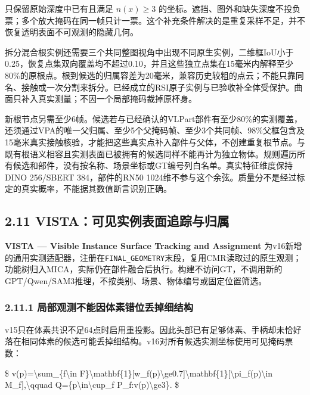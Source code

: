 \documentclass[UTF8,fontset=fandol]{ctexart}
\begin{document}
只保留原始深度中已有且满足 $n(x)\ge3$ 的坐标。遮挡、图外和缺失深度不投负票；多个放大掩码在同一帧只计一票。这个补充条件解决的是重复采样不足，并不恢复透明表面不可观测的隐藏几何。



拆分混合根实例还需要三个共同整图视角中出现不同原生实例，二维框IoU小于0.25，恢复点集双向覆盖均不超过0.10，并且这些独立点集在15毫米内解释至少80\%的原根点。根到候选的归属容差为20毫米，兼容历史较粗的点云；不能只靠同名、接触或一次分割来拆分。已经成立的RSI原子实例与已验收补全体受保护。曲面只补入真实测量；不因一个局部掩码裁掉原杯身。



新根节点另需至少6帧。候选若与已经确认的VLPart部件有至少80\%的实测覆盖，还须通过VPA的唯一父归属、至少5个父掩码帧、至少3个共同帧、98\%父框包含及15毫米真实接触核验，才能把这些真实点补入部件与父体，不创建重复根节点。与既有根语义相容且实测表面已被拥有的候选同样不能再计为独立物体。规则遍历所有候选和部件，没有按名称、场景坐标或GT编号列白名单。真实特征维度保持DINO 256/SBERT 384，部件的RN50 1024维不参与这个余弦。质量分不是经过标定的真实概率，不能据其数值断言识别正确。



\subsection*{2.11 VISTA：可见实例表面追踪与归属}

\textbf{VISTA — Visible Instance Surface Tracking and Assignment} 为v16新增的通用实测适配器，注册在\texttt{FINAL\_\allowbreak{}GEOMETRY}末段，复用CMR读取过的原生观测；功能树归入MICA，实际仍在部件融合后执行。构建不访问GT，不调用新的GPT/Qwen/SAM3推理，不按类别、场景、物体编号或固定位置筛选。



\subsubsection*{2.11.1 局部观测不能因体素错位丢掉细结构}

v15只在体素共识不足64点时启用重投影。因此头部已有足够体素、手柄却未恰好落在相同体素的候选可能丢掉细结构。v16对所有候选实测坐标使用可见掩码票数：



\$
v(p)=\textbackslash{}sum\_\{f\textbackslash{}in F\}\textbackslash{}mathbf\{1\}[w\_f(p)\textbackslash{}ge0.7]\textbackslash{}mathbf\{1\}[\textbackslash{}pi\_f(p)\textbackslash{}in M\_f],\textbackslash{}qquad Q=\{p\textbackslash{}in\textbackslash{}cup\_f P\_f:v(p)\textbackslash{}ge3\}.
\$
\end{document}
